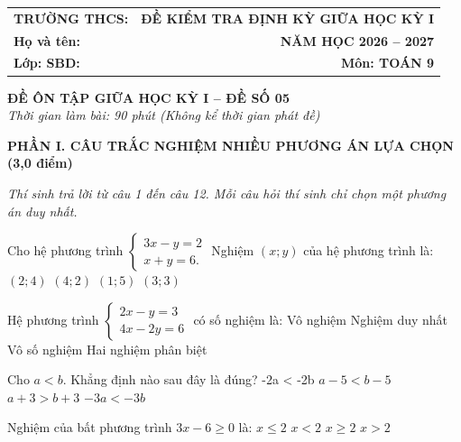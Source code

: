 \documentclass[12pt,a4paper]{article}
\begin{document}
\noindent
\begin{tabularx}{\linewidth}{X r}
\textbf{TRƯỜNG THCS: \dotfill} & \textbf{ĐỀ KIỂM TRA ĐỊNH KỲ GIỮA HỌC KỲ I} \\
\textbf{Họ và tên: \dotfill} & \textbf{NĂM HỌC 2026 -- 2027} \\
\textbf{Lớp: \dotfill \quad SBD: \dotfill} & \textbf{Môn: TOÁN 9} \\
\hline
\end{tabularx}
\vspace{2mm}

\begin{center}
  \textbf{\large ĐỀ ÔN TẬP GIỮA HỌC KỲ I -- ĐỀ SỐ 05}\\
  \textit{Thời gian làm bài: 90 phút (Không kể thời gian phát đề)}
\end{center}
\vspace{1mm}

\noindent\textbf{\large PHẦN I. CÂU TRẮC NGHIỆM NHIỀU PHƯƠNG ÁN LỰA CHỌN (3,0 điểm)}

\textit{Thí sinh trả lời từ câu 1 đến câu 12. Mỗi câu hỏi thí sinh chỉ chọn một phương án duy nhất.}

\vspace{1mm}
\begin{ex}
Cho hệ phương trình $\begin{cases} 3x - y = 2 \\ x + y = 6. \end{cases}$ Nghiệm $(x; y)$ của hệ phương trình là:
\choice
{\True $(2; 4)$}
{$(4; 2)$}
{$(1; 5)$}
{$(3; 3)$}
\end{ex}

\begin{ex}
Hệ phương trình $\begin{cases} 2x - y = 3 \\ 4x - 2y = 6 \end{cases}$ có số nghiệm là:
\choice
{Vô nghiệm}
{Nghiệm duy nhất}
{\True Vô số nghiệm}
{Hai nghiệm phân biệt}
\end{ex}

\begin{ex}
Cho $a < b$. Khẳng định nào sau đây là đúng?
\choice
{-2a < -2b}
{\True $a - 5 < b - 5$}
{$a + 3 > b + 3$}
{$-3a < -3b$}
\end{ex}

\begin{ex}
Nghiệm của bất phương trình $3x - 6 \ge 0$ là:
\choice
{$x \le 2$}
{$x < 2$}
{\True $x \ge 2$}
{$x > 2$}
\end{ex}
\end{document}
